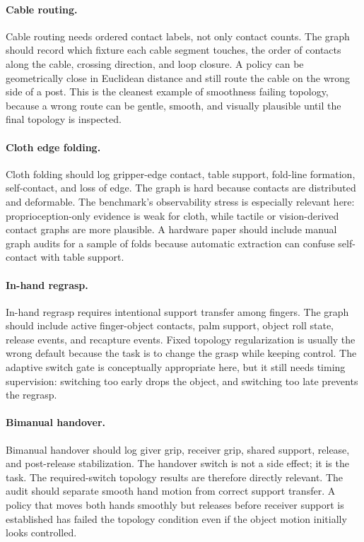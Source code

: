 \documentclass{article}
\begin{document}
\paragraph{Cable routing.}
Cable routing needs ordered contact labels, not only contact counts. The graph should record which fixture each cable segment touches, the order of contacts along the cable, crossing direction, and loop closure. A policy can be geometrically close in Euclidean distance and still route the cable on the wrong side of a post. This is the cleanest example of smoothness failing topology, because a wrong route can be gentle, smooth, and visually plausible until the final topology is inspected.

\paragraph{Cloth edge folding.}
Cloth folding should log gripper-edge contact, table support, fold-line formation, self-contact, and loss of edge. The graph is hard because contacts are distributed and deformable. The benchmark's observability stress is especially relevant here: proprioception-only evidence is weak for cloth, while tactile or vision-derived contact graphs are more plausible. A hardware paper should include manual graph audits for a sample of folds because automatic extraction can confuse self-contact with table support.

\paragraph{In-hand regrasp.}
In-hand regrasp requires intentional support transfer among fingers. The graph should include active finger-object contacts, palm support, object roll state, release events, and recapture events. Fixed topology regularization is usually the wrong default because the task is to change the grasp while keeping control. The adaptive switch gate is conceptually appropriate here, but it still needs timing supervision: switching too early drops the object, and switching too late prevents the regrasp.

\paragraph{Bimanual handover.}
Bimanual handover should log giver grip, receiver grip, shared support, release, and post-release stabilization. The handover switch is not a side effect; it is the task. The required-switch topology results are therefore directly relevant. The audit should separate smooth hand motion from correct support transfer. A policy that moves both hands smoothly but releases before receiver support is established has failed the topology condition even if the object motion initially looks controlled.
\end{document}

